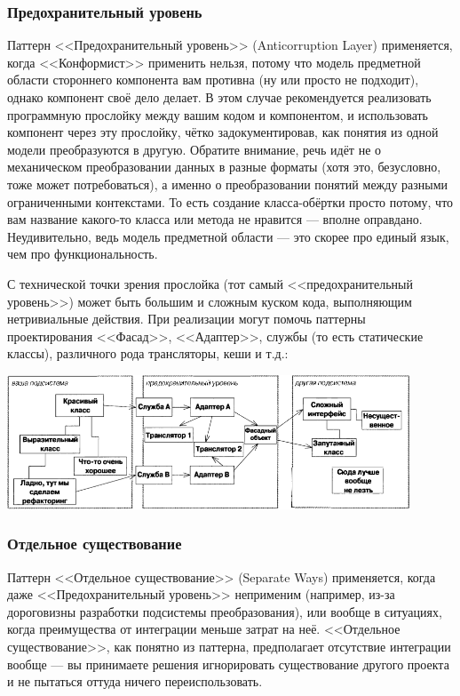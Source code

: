 \documentclass[a5paper]{article}
\begin{document}
\subsubsection{Предохранительный уровень}

Паттерн <<Предохранительный уровень>> (Anticorruption Layer) применяется, когда <<Конформист>> применить нельзя, потому что модель предметной области стороннего компонента вам противна (ну или просто не подходит), однако компонент своё дело делает. В этом случае рекомендуется реализовать программную прослойку между вашим кодом и компонентом, и использовать компонент через эту прослойку, чётко задокументировав, как понятия из одной модели преобразуются в другую. Обратите внимание, речь идёт не о механическом преобразовании данных в разные форматы (хотя это, безусловно, тоже может потребоваться), а именно о преобразовании понятий между разными ограниченными контекстами. То есть создание класса-обёртки просто потому, что вам название какого-то класса или метода не нравится --- вполне оправдано. Неудивительно, ведь модель предметной области --- это скорее про единый язык, чем про функциональность.

С технической точки зрения прослойка (тот самый <<предохранительный уровень>>) может быть большим и сложным куском кода, выполняющим нетривиальные действия. При реализации могут помочь паттерны проектирования <<Фасад>>, <<Адаптер>>, службы (то есть статические классы), различного рода трансляторы, кеши и т.д.:

\begin{center}
    \includegraphics[width=0.9\textwidth]{anticorruptionLayer.png}
\end{center}

\subsubsection{Отдельное существование}

Паттерн <<Отдельное существование>> (Separate Ways) применяется, когда даже <<Предохранительный уровень>> неприменим (например, из-за дороговизны разработки подсистемы преобразования), или вообще в ситуациях, когда преимущества от интеграции меньше затрат на неё. <<Отдельное существование>>, как понятно из паттерна, предполагает отсутствие интеграции вообще --- вы принимаете решения игнорировать существование другого проекта и не пытаться оттуда ничего переиспользовать. 
\end{document}
